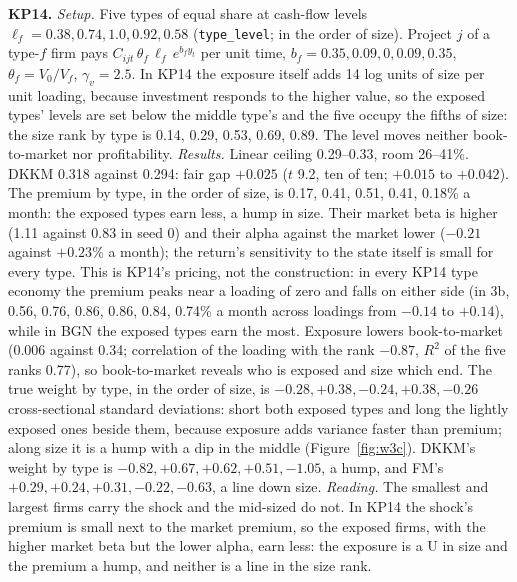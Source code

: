 \documentclass[11pt]{article}
\begin{document}
\noindent\textbf{KP14.} \emph{Setup.} Five types of equal share at cash-flow levels $\ell_f = 0.38, 0.74, 1.0, 0.92, 0.58$ (\texttt{type\_level}; in the order of size). Project $j$ of a type-$f$ firm pays $C_{ijt}\,\theta_f\,\ell_f\,e^{b_f y_t}$ per unit time, $b_f = 0.35, 0.09, 0, 0.09, 0.35$, $\theta_f = V_0/V_f$, $\gamma_v = 2.5$. In KP14 the exposure itself adds 14 log units of size per unit loading, because investment responds to the higher value, so the exposed types' levels are set below the middle type's and the five occupy the fifths of size: the size rank by type is 0.14, 0.29, 0.53, 0.69, 0.89. The level moves neither book-to-market nor profitability. \emph{Results.} Linear ceiling 0.29--0.33, room 26--41\%. DKKM 0.318 against 0.294: fair gap $+0.025$ ($t$ 9.2, ten of ten; $+0.015$ to $+0.042$). The premium by type, in the order of size, is 0.17, 0.41, 0.51, 0.41, 0.18\% a month: the exposed types earn less, a hump in size. Their market beta is higher (1.11 against 0.83 in seed 0) and their alpha against the market lower ($-0.21$ against $+0.23$\% a month); the return's sensitivity to the state itself is small for every type. This is KP14's pricing, not the construction: in every KP14 type economy the premium peaks near a loading of zero and falls on either side (in 3b, 0.56, 0.76, 0.86, 0.86, 0.84, 0.74\% a month across loadings from $-0.14$ to $+0.14$), while in BGN the exposed types earn the most. Exposure lowers book-to-market (0.006 against 0.34; correlation of the loading with the rank $-0.87$, $R^2$ of the five ranks 0.77), so book-to-market reveals who is exposed and size which end. The true weight by type, in the order of size, is $-0.28, +0.38, -0.24, +0.38, -0.26$ cross-sectional standard deviations: short both exposed types and long the lightly exposed ones beside them, because exposure adds variance faster than premium; along size it is a hump with a dip in the middle (Figure~\ref{fig:w3c}). DKKM's weight by type is $-0.82, +0.67, +0.62, +0.51, -1.05$, a hump, and FM's $+0.29, +0.24, +0.31, -0.22, -0.63$, a line down size. \emph{Reading.} The smallest and largest firms carry the shock and the mid-sized do not. In KP14 the shock's premium is small next to the market premium, so the exposed firms, with the higher market beta but the lower alpha, earn less: the exposure is a U in size and the premium a hump, and neither is a line in the size rank.
\end{document}
